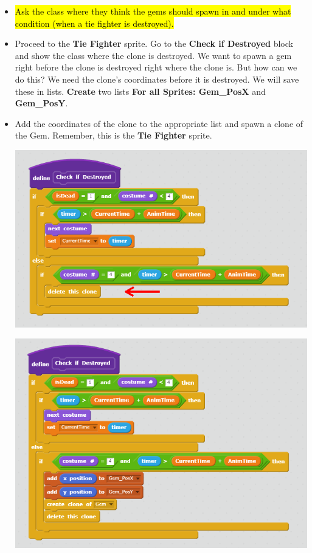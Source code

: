 \documentclass[12pt]{article}
\begin{document}
	\begin{itemize}
		\item \hl{Ask the class where they think the gems should spawn in and under what condition (when a tie fighter is destroyed).} 
		\item Proceed to the \textbf{Tie Fighter} sprite. Go to the \textbf{Check if Destroyed} block and show the class where the clone is destroyed. We want to spawn a gem right before the clone is destroyed right where the clone is. But how can we do this? We need the clone's coordinates before it is destroyed. We will save these in lists. \textbf{Create} two lists \textbf{For all Sprites: Gem\_PosX} and \textbf{Gem\_PosY}. 
		\newpage
		\item Add the coordinates of the clone to the appropriate list and spawn a clone of the Gem. Remember, this is the \textbf{Tie Fighter} sprite.

		\begin{center}
			\includegraphics[scale = 0.47]{./Images/TieFighter_CheckDead.png}
		\end{center}

		\begin{center}
			\includegraphics[scale = 0.47]{./Images/TieFighter_CheckDead_2.png}
		\end{center}


\end{itemize}
\end{document}
